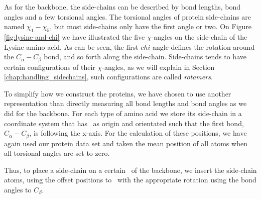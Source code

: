 As for the backbone, the side-chains can be described by bond lengths,
bond angles and a few torsional angles.  The torsional angles of
protein side-chains are named $\chi_1-\chi_5$, but most side-chains
only have the first angle or two. On Figure \ref{fig:lysine-and-chi}
we have illustrated the five $\chi$-angles on the side-chain of the
Lysine amino acid. As can be seen, the first $chi$ angle defines the
rotation around the $C_\alpha-C_\beta$ bond, and so forth along the
side-chain. Side-chains tends to have certain configurations of their
$\chi$-angles, as we will explain in Section
\ref{chap:handling_sidechains}, such configurations are called
\textit{rotamers}.

To simplify how we construct the proteins, we have chosen to use
another representation than directly measuring all bond lengths and
bond angles as we did for the backbone. For each type of amino acid we
store its side-chain in a coordinate system that has \Ca\ as origin and
orientated such that the first bond, $C_\alpha-C_\beta$, is following
the x-axis. For the calculation of these positions, we have again used
our protein data set and taken the mean position of all atoms when all
torsional angles are set to zero.

Thus, to place a side-chain on a certain \Ca\ of the backbone, we
insert the side-chain atoms, using the offset positions to \Ca\ with
the appropriate rotation using the bond angles to $C_\beta$.

